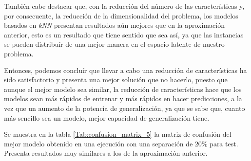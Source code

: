 \documentclass[12pt]{article}
\begin{document}
\bigskip
También cabe destacar que, con la reducción del número de las características y,
por consecuente, la reducción de la dimensionalidad del problema, los modelos basados
en \textit{kNN} presentan resultados aún mejores que en la aproximación anterior,
esto es un resultado que tiene sentido que sea así, ya que las instancias se pueden
distribuír de una mejor manera en el espacio latente de nuestro problema.

\bigskip
Entonces, podemos concluír que llevar a cabo una reducción de características ha sido
satisfactorio y presenta una mejor solución que no hacerlo, puesto que aunque el mejor
modelo sea similar, la reducción de características hace que los modelos sean más rápidos
de entrenar y más rápidos en hacer predicciones, a la vez que un aumento de la potencia de
generalización, ya que se sabe que, cuanto más sencillo sea un modelo, mejor capacidad
de generalización tiene.

\bigskip
Se muestra en la tabla \ref{Tab:confusion_matrix_5} la matriz de confusión del mejor
modelo obtenido en una ejecución con una separación de $20\%$ para test. Presenta
resultados muy similares a los de la aproximación anterior.
\end{document}
